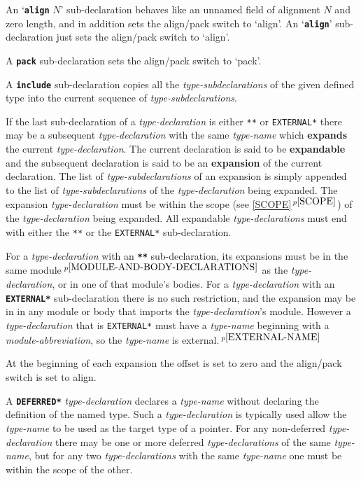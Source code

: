 \documentclass[12pt]{article}
\newcommand{\key}[1]{{\rm \bfseries #1}}
\newcommand{\ttkey}[1]{{\tt \bfseries #1}}
\newcommand{\skey}[2]{{\rm \bfseries #1#2}}
\newcommand{\itemref}[1]{\ref{#1}$\,^{p\pageref{#1}}$}
\newcommand{\pagnote}[1]{$\,^{p\pageref{#1}}$}
\begin{document}
An `\ttkey{align} $N$' sub-declaration behaves like an unnamed
field of alignment $N$ and zero length,
and in addition sets the align/pack switch to `align'.
An `\ttkey{align}' sub-declaration just sets the
align/pack switch to `align'.

A \ttkey{pack} sub-declaration sets the align/pack switch to `pack'.

A \ttkey{include} sub-declaration copies all the {\em type-subdeclarations}
of the given defined type into the current sequence of
{\em type-subdeclarations}.

If the last sub-declaration of a {\em type-declaration}
is either {\tt ***}\label{***} or {\tt *EXTERNAL*}\label{*EXTERNAL*}
there may be a subsequent {\em type-declaration} with the same
{\em type-name} which \skey{expand}s the current {\em type-declaration}.
The current declaration is said to be \key{expandable} and
the subsequent declaration is said to be an \key{expansion}
of the current declaration.
The list of {\em type-subdeclarations}\label{TYPE-DECLARATION-APPEND}
of an expansion is simply appended to the list of
{\em type-subdeclarations} of the {\em type-declaration} being expanded.
The expansion {\em type-declaration}
must be within the scope (see \itemref{SCOPE}) of the {\em type-declaration}
being expanded.   All expandable {\em type-declarations} must end with
either the {\tt ***} or the {\tt *EXTERNAL*} sub-declaration.

For a {\em type-declaration} with an \ttkey{***} sub-declaration,
its expansions must be in the same module\pagnote{MODULE-AND-BODY-DECLARATIONS}
as the {\em type-declaration}, or in one of that module's bodies.
For a {\em type-declaration} with an \ttkey{*EXTERNAL*} sub-declaration
there is no such restriction, and the expansion may be in
in any module or body that imports the {\em type-declaration}'s
module.  However a {\em type-declaration} that is {\tt *EXTERNAL*}
must have a {\em type-name} beginning with a {\em module-abbreviation}, so
the {\em type-name} is external.\pagnote{EXTERNAL-NAME}

At the beginning of each expansion the offset is set to zero and
the align/pack switch is set to align.

A \ttkey{*DEFERRED*} {\em type-declaration} declares a {\em type-name}
without declaring the definition of the named type.
Such a {\em type-declaration} is typically used allow the {\em type-name}
to be used as the target type of a pointer.
For any non-deferred {\em type-declaration} there may be one or more
deferred {\em type-declarations} of the same {\em type-name}, but for
any two {\em type-declarations} with the same {\em type-name}
one must be within the scope of the other.
\end{document}

